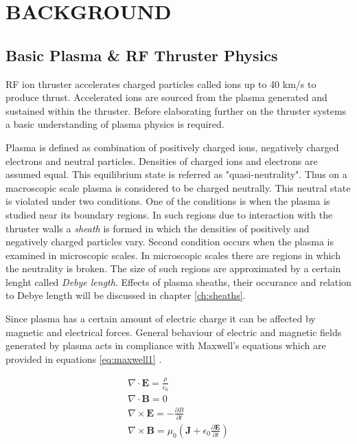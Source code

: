 \chapter{BACKGROUND}\label{ch:2_background}
\vspace*{-12pt} %
\section{Basic Plasma \& RF Thruster Physics}\label{ChBasicPlasma}
RF ion thruster accelerates charged particles called ions up to 40 km/s to produce thrust\cite{goebel2008fundamentals}. Accelerated ions are sourced from the plasma generated and sustained within the thruster. Before elaborating further on the thruster systems a basic understanding of plasma physics is required. 

\par Plasma is defined as combination of positively charged ions, negatively charged electrons and neutral particles. Densities of charged ions and electrons are assumed equal. This equilibrium state is referred as "quasi-neutrality"\cite{Calik2011}. Thus on a macroscopic scale plasma is considered to be charged neutrally. 
This neutral state is violated under two conditions. One of the conditions is when the plasma is studied near its boundary regions. In such regions due to interaction with the thruster walls a \textit{sheath} is formed in which the densities of positively and negatively charged particles vary.
Second condition occurs when the plasma is examined in microscopic scales. In microscopic scales there are regions in which the neutrality is broken\cite{lieberman2005principles}. The size of such regions are approximated by a certain lenght called \textit{Debye length}.  Effects of plasma sheaths, their occurance and relation to Debye length will be discussed in chapter \ref{ch:sheaths}. 

\par Since plasma has a certain amount of electric charge it can be affected by magnetic and electrical forces\cite{Couch2017}. General behaviour of electric and magnetic fields generated by plasma acts in compliance with Maxwell's equations which are provided in equations \ref{eq:maxwell1} \cite{griffiths2005introduction}.

\begin{equation}
    \begin{aligned}  
    \nabla \cdot \mathbf{E} = \frac{\rho}{\epsilon_0} \\
    \nabla \cdot \mathbf{B} = 0 \\
    \nabla \times \mathbf{E} = - \frac{\partial B}{\partial t} \\
    \nabla \times \mathbf{B} = \mu_0 \left(\textbf{J}+\epsilon_0 \frac{\partial \mathbf{E}}{\partial t}\right)
\end{aligned}
\label{eq:maxwell1}
\end{equation}


